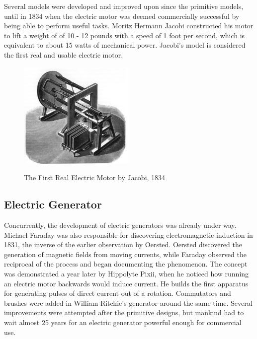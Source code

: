     \noindent
    Several models were developed and improved upon since the primitive models, until in 1834 when the electric motor was deemed commercially successful by being able to perform useful tasks. Moritz Hermann Jacobi constructed his motor to lift a weight of of 10 - 12 pounds with a speed of 1 foot per second, which is equivalent to about 15 watts of mechanical power. \cite{needcite} Jacobi’s model is considered the first real and usable electric motor.

    \begin{figure}[ht]
        \begin{center}
            \includegraphics[width=0.5\textwidth]{figures/history/jacobi.jpg}
            \label{fig:jacobi}
        \end{center} \caption{The First Real Electric Motor by Jacobi, 1834}
    \end{figure}

    \subsection{Electric Generator}
    Concurrently, the development of electric generators was already under way. Michael Faraday was also responsible for discovering electromagnetic induction in 1831, the inverse of the earlier observation by Oersted. Oersted discovered the generation of magnetic fields from moving currents, while Faraday observed the reciprocal of the process and began documenting the phenomenon. The concept was demonstrated a year later by Hippolyte Pixii, when he noticed how running an electric motor backwards would induce current. He builds the first apparatus for generating pulses of direct current out of a rotation. \cite{needcite} Commutators and brushes were added in William Ritchie’s generator around the same time. Several improvements were attempted after the primitive designs, but mankind had to wait almost 25 years for an electric generator powerful enough for commercial use.\\

